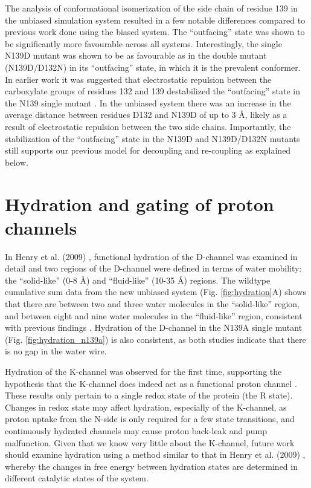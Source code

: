 The analysis of conformational isomerization of the side chain of residue 139 in the unbiased simulation system resulted in a few notable differences compared to previous work done using the biased system. The ``outfacing'' state was shown to be significantly more favourable across all systems. Interestingly, the single N139D mutant was shown to be as favourable as in the double mutant (N139D/D132N) in its ``outfacing'' state, in which it is the prevalent conformer. In earlier work it was suggested that electrostatic repulsion between the carboxylate groups of residues 132 and 139 destabilized the ``outfacing'' state in the N139 single mutant \cite{Henry:2011p10221}. In the unbiased system there was an increase in the average distance between residues D132 and N139D of up to 3 Å, likely as a result of electrostatic repulsion between the two side chains. Importantly, the stabilization of the ``outfacing'' state in the N139D and N139D/D132N mutants still supports our previous model for decoupling and re-coupling \cite{Henry:2011p10221} as explained below.

\section{Hydration and gating of proton channels}

In Henry et al. (2009) \cite{Henry:2009p4543}, functional hydration of the D-channel was examined in detail and two regions of the D-channel were defined in terms of water mobility: the ``solid-like'' (0-8 Å) and ``fluid-like'' (10-35 Å) regions. The wildtype cumulative sum data from the new unbiased system (Fig. \ref{fig:hydration}A) shows that there are between two and three water molecules in the ``solid-like'' region, and between eight and nine water molecules in the ``fluid-like'' region, consistent with previous findings \cite{Henry:2009p4543}. Hydration of the D-channel in the N139A single mutant (Fig. \ref{fig:hydration_n139a}) is also consistent, as both studies indicate that there is no gap in the water wire.

Hydration of the K-channel was observed for the first time, supporting the hypothesis that the K-channel does indeed act as a functional proton channel \cite{Tomson:2003p10255,Ganesan:2010p8417}. These results only pertain to a single redox state of the protein (the R state). Changes in redox state may affect hydration, especially of the K-channel, as proton uptake from the N-side is only required for a few state transitions, and continuously hydrated channels may cause proton back-leak and pump malfunction. Given that we know very little about the K-channel, future work should examine hydration using a method similar to that in Henry et al. (2009) \cite{Henry:2009p4543}, whereby the changes in free energy between hydration states are determined in different catalytic states of the system.

